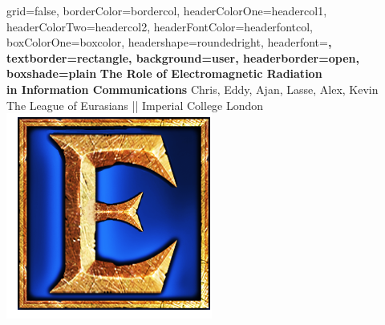 \documentclass[a0paper,portrait]{baposter}
\begin{document}
\begin{poster}{
grid=false,
borderColor=bordercol, %
headerColorOne=headercol1, %
headerColorTwo=headercol2, %
headerFontColor=headerfontcol, %
boxColorOne=boxcolor, %
headershape=roundedright, %
headerfont=\Large\sf\bf, %
textborder=rectangle,
background=user,
headerborder=open, %
boxshade=plain
}
{}
{\sf\bf The  Role  of  Electromagnetic  Radiation\\ in  Information  Communications} %
{\vspace{1em} Chris, Eddy, Ajan, Lasse, Alex, Kevin\\The League of Eurasians || Imperial College London} %
{\includegraphics[scale=1.1]{the_logo}} %




\end{poster}
\end{document}
